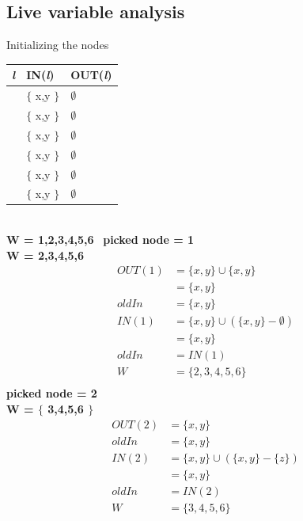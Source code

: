 \documentclass[a4paper, 12pt]{article}
\newcommand{\tab}{\-\ \hspace{.5cm}}
\begin{document}
\subsection{Live variable analysis}
Initializing the nodes \\
\begin{center}
	\begin{tabular}{| >{\centering\arraybackslash} m{2cm} | >{\centering\arraybackslash} m{4cm} | >{\centering\arraybackslash} m{2cm} |} 
		\hline
		\textit{l} & IN(\textit{l}) & OUT(\textit{l}) \\
		\hline
		 1 & $\lbrace$ x,y $\rbrace$ & $\emptyset$ \\
		 \hline
		 2 & $\lbrace$ x,y $\rbrace$ & $\emptyset$ \\
		 \hline
		 3 & $\lbrace$ x,y $\rbrace$ & $\emptyset$ \\
		 \hline
		 4 & $\lbrace$ x,y $\rbrace$ & $\emptyset$ \\
		 \hline
		 5 & $\lbrace$ x,y $\rbrace$ & $\emptyset$ \\
		 \hline
		 6 & $\lbrace$ x,y $\rbrace$ & $\emptyset$ \\
		 \hline
	\end{tabular}
\end{center} ~\\
\textbf{W = 1,2,3,4,5,6} \tab \textbf{picked node = 1} \\
\textbf{W = 2,3,4,5,6} \\
\begin{align*}
	OUT(1) &= \lbrace x,y \rbrace \cup \lbrace x,y \rbrace \\
	&= \lbrace x,y \rbrace \\
	oldIn &= \lbrace x,y \rbrace \\
	IN(1) &= \lbrace x,y \rbrace \cup (\lbrace x,y \rbrace - \emptyset) \\
	&= \lbrace x,y \rbrace \\
	oldIn &= IN(1) \\
	W &= \lbrace 2,3,4,5,6 \rbrace \\
\end{align*}
\textbf{picked node = 2} \\
\textbf{W = $\lbrace$ 3,4,5,6 $\rbrace$} \\
\begin{align*}
	OUT(2) &= \lbrace x,y \rbrace \\
	oldIn &= \lbrace x,y \rbrace \\
	IN(2) &= \lbrace x,y \rbrace \cup (\lbrace x,y \rbrace - \lbrace z \rbrace) \\
	&= \lbrace x,y \rbrace \\
	oldIn &= IN(2) \\
	W &= \lbrace 3,4,5,6 \rbrace \\
\end{align*}
\end{document}
